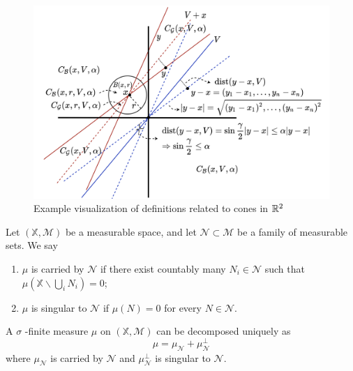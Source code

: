 \begin{figure}[H]
    \centering
    \includegraphics[width=.8\textwidth]{images/conedef.png}
    \caption{Example visualization of definitions related to cones in $\mathbb{R}^2$}
\end{figure}

\begin{definition}
   Let $(\mathbb{X}, \mathcal{M})$ be a measurable space, and let $\mathcal{N} \subset \mathcal{M}$ be a family of measurable sets. We say
   \begin{enumerate}[(1)]
       \item $\mu$ is carried by $\mathcal{N}$ if there exist countably many $N_{i} \in \mathcal{N}$ such that $\mu\left(\mathbb{X} \backslash \bigcup_{i} N_{i}\right)=0$;
       \item $\mu$ is singular to $\mathcal{N}$ if $\mu(N)=0$ for every $N \in \mathcal{N}$.    
   \end{enumerate}
   A $\sigma$ -finite measure $\mu$ on $(\mathbb{X}, \mathcal{M})$ can be decomposed uniquely as
       $$
       \mu=\mu_{\mathcal{N}}+\mu_{\mathcal{N}}^{\perp}
       $$
       where $\mu_{\mathcal{N}}$ is carried by $\mathcal{N}$ and $\mu_{\mathcal{N}}^{\perp}$ is singular to $\mathcal{N}$. 
\end{definition}

